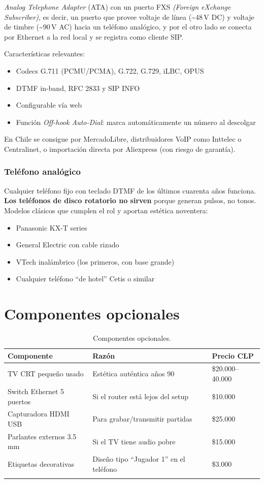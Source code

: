 \emph{Analog Telephone Adapter} (ATA) con un puerto FXS \emph{(Foreign eXchange Subscriber)}, es decir, un puerto que provee voltaje de línea (\textasciitilde48\,V DC) y voltaje de timbre (\textasciitilde90\,V AC) hacia un teléfono analógico, y por el otro lado se conecta por Ethernet a la red local y se registra como cliente SIP.

Características relevantes:

\begin{itemize}
  \item Codecs G.711 (PCMU/PCMA), G.722, G.729, iLBC, OPUS
  \item DTMF in-band, RFC 2833 y SIP INFO
  \item Configurable vía web
  \item Función \emph{Off-hook Auto-Dial}: marca automáticamente un número al descolgar
\end{itemize}

En Chile se consigue por MercadoLibre, distribuidores VoIP como Inttelec o Centralinet, o importación directa por Aliexpress (con riesgo de garantía).

\subsubsection{Teléfono analógico}

Cualquier teléfono fijo con teclado DTMF de los últimos cuarenta años funciona. \textbf{Los teléfonos de disco rotatorio no sirven} porque generan pulsos, no tonos. Modelos clásicos que cumplen el rol y aportan estética noventera:

\begin{itemize}
  \item Panasonic KX-T series
  \item General Electric con cable rizado
  \item VTech inalámbrico (los primeros, con base grande)
  \item Cualquier teléfono ``de hotel'' Cetis o similar
\end{itemize}

\section{Componentes opcionales}

\begin{longtable}{p{} p{} R{0.15\textwidth}}
\toprule
\textbf{Componente} & \textbf{Razón} & \textbf{Precio CLP} \\
\midrule
\endhead
TV CRT pequeño usado & Estética auténtica años 90 & \$20.000--40.000 \\
Switch Ethernet 5 puertos & Si el router está lejos del setup & \$10.000 \\
Capturadora HDMI USB & Para grabar/transmitir partidas & \$25.000 \\
Parlantes externos 3.5\,mm & Si el TV tiene audio pobre & \$15.000 \\
Etiquetas decorativas & Diseño tipo ``Jugador 1'' en el teléfono & \$3.000 \\
\bottomrule
\caption{Componentes opcionales.}\\
\end{longtable}

